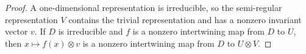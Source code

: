\begin{proof}\leanok
    A one-dimensional representation is irreducible, so the semi-regular
    representation $V$ contains the trivial representation and has a nonzero
    invariant vector $v$. If $D$ is irreducible and $f$ is a nonzero
    intertwining map from $D$ to $U$, then $x\mapsto f(x)\otimes v$ is a
    nonzero intertwining map from $D$ to $U\otimes V$.
\end{proof}
